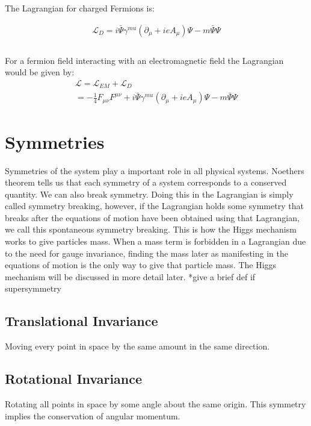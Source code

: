\documentclass[aps,secnumarabic,nobalancelastpage,amsmath,amssymb,
nofootinbib]{revtex4}
\newcommand{\Lagr}{\mathcal{L}}
\begin{document}
\noindent The Lagrangian for charged Fermions is:

\begin{equation}
\begin{split}
\Lagr_D= i \bar{\Psi} \gamma^{mu} (\partial_\mu + i e A_\mu) \Psi - m \bar{\Psi} \Psi \\\\
\end{split}
\end{equation}

\noindent For a fermion field interacting with an electromagnetic field the Lagrangian would be given by:\\
\begin{equation}
\begin{split}
\Lagr=\Lagr_{EM}+\Lagr_D
\\
= -\frac{1}{4} F_{\mu\nu}F^{\mu\nu} + i \bar{\Psi} \gamma^{mu} (\partial_\mu + i e A_\mu) \Psi - m \bar{\Psi} \Psi
\end{split}
\end{equation}





\section{Symmetries}

Symmetries of the system play a important role in all physical systems. Noethers theorem tells us that each symmetry of a system corresponds to a conserved quantity. We can also break symmetry. Doing this in the Lagrangian is simply called symmetry breaking, however, if the Lagrangian holds some symmetry that breaks after the equations of motion have been obtained using that Lagrangian, we call this spontaneous symmetry breaking. This is how the Higgs mechanism works to give particles mass. When a mass term is forbidden in a Lagrangian due to the need for gauge invariance, finding the mass later as manifesting in the equations of motion is the only way to give that particle mass. The Higgs mechanism will be discussed in more detail later. *give a brief def if supersymmetry

\subsection{Translational Invariance}
Moving every point in space by the same amount in the same direction.
\subsection{Rotational Invariance}
Rotating all points in space by some angle about the same origin. This symmetry implies the conservation of angular momentum.
\end{document}
